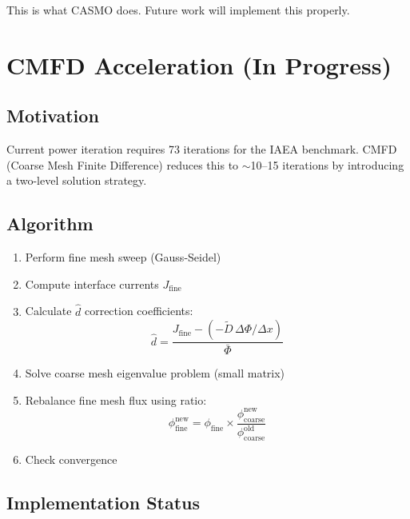 \documentclass[12pt,a4paper]{article}
\begin{document}
This is what CASMO does. Future work will implement this properly.

\section{CMFD Acceleration (In Progress)}

\subsection{Motivation}

Current power iteration requires 73 iterations for the IAEA benchmark.
CMFD (Coarse Mesh Finite Difference) reduces this to $\sim$10--15 iterations
by introducing a two-level solution strategy.

\subsection{Algorithm}

\begin{enumerate}
    \item Perform fine mesh sweep (Gauss-Seidel)
    \item Compute interface currents $J_{\text{fine}}$
    \item Calculate $\hat{d}$ correction coefficients:
        \begin{equation}
            \hat{d} = \frac{J_{\text{fine}} -
            \left(-\tilde{D}\,\Delta\Phi/\Delta x\right)}{\bar{\Phi}}
        \end{equation}
    \item Solve coarse mesh eigenvalue problem (small matrix)
    \item Rebalance fine mesh flux using ratio:
        \begin{equation}
            \phi_{\text{fine}}^{\text{new}} = \phi_{\text{fine}}
            \times \frac{\phi_{\text{coarse}}^{\text{new}}}
            {\phi_{\text{coarse}}^{\text{old}}}
        \end{equation}
    \item Check convergence
\end{enumerate}

\subsection{Implementation Status}
\end{document}
